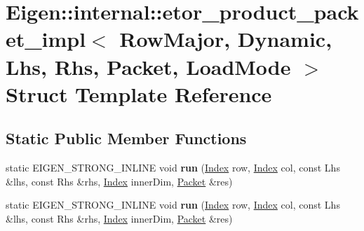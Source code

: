\hypertarget{struct_eigen_1_1internal_1_1etor__product__packet__impl_3_01_row_major_00_01_dynamic_00_01_lhs_0c65718b6a3655f284deba0aadf4c1914}{}\section{Eigen\+:\+:internal\+:\+:etor\+\_\+product\+\_\+packet\+\_\+impl$<$ Row\+Major, Dynamic, Lhs, Rhs, Packet, Load\+Mode $>$ Struct Template Reference}
\label{struct_eigen_1_1internal_1_1etor__product__packet__impl_3_01_row_major_00_01_dynamic_00_01_lhs_0c65718b6a3655f284deba0aadf4c1914}
\subsection*{Static Public Member Functions}
\begin{DoxyCompactItemize}
\item 
\mbox{\label{struct_eigen_1_1internal_1_1etor__product__packet__impl_3_01_row_major_00_01_dynamic_00_01_lhs_0c65718b6a3655f284deba0aadf4c1914_aaa718357e8131925569cc9cd0363ef63}} 
static E\+I\+G\+E\+N\+\_\+\+S\+T\+R\+O\+N\+G\+\_\+\+I\+N\+L\+I\+NE void {\bfseries run} (\hyperlink{namespace_eigen_a62e77e0933482dafde8fe197d9a2cfde}{Index} row, \hyperlink{namespace_eigen_a62e77e0933482dafde8fe197d9a2cfde}{Index} col, const Lhs \&lhs, const Rhs \&rhs, \hyperlink{namespace_eigen_a62e77e0933482dafde8fe197d9a2cfde}{Index} inner\+Dim, \hyperlink{union_eigen_1_1internal_1_1_packet}{Packet} \&res)
\item 
\mbox{\label{struct_eigen_1_1internal_1_1etor__product__packet__impl_3_01_row_major_00_01_dynamic_00_01_lhs_0c65718b6a3655f284deba0aadf4c1914_aaa718357e8131925569cc9cd0363ef63}} 
static E\+I\+G\+E\+N\+\_\+\+S\+T\+R\+O\+N\+G\+\_\+\+I\+N\+L\+I\+NE void {\bfseries run} (\hyperlink{namespace_eigen_a62e77e0933482dafde8fe197d9a2cfde}{Index} row, \hyperlink{namespace_eigen_a62e77e0933482dafde8fe197d9a2cfde}{Index} col, const Lhs \&lhs, const Rhs \&rhs, \hyperlink{namespace_eigen_a62e77e0933482dafde8fe197d9a2cfde}{Index} inner\+Dim, \hyperlink{union_eigen_1_1internal_1_1_packet}{Packet} \&res)
\end{DoxyCompactItemize}



